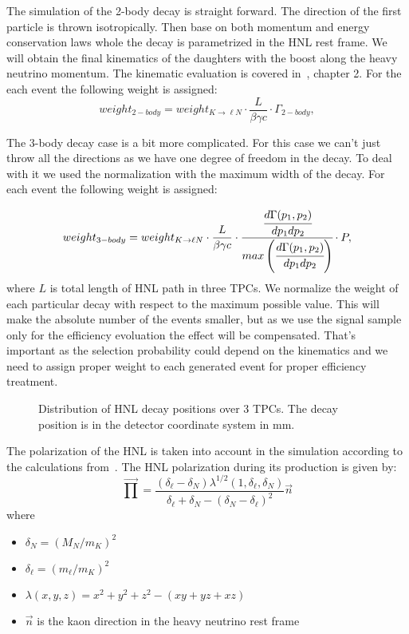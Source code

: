 \documentclass[../main.tex]{subfiles}
\begin{document}
The simulation of the 2-body decay is straight forward. The direction of the first particle is thrown isotropically. Then base on both momentum and energy conservation laws whole the decay is parametrized in the HNL rest frame. We will obtain the final kinematics of the daughters with the boost along the heavy neutrino momentum. The kinematic evaluation is covered in~\cite{landau2013}, chapter 2. For the each event the following weight is assigned:
\begin{equation}
    weight_{2-body}=weight_{K\rightarrow \ell N}\cdot\frac{L}{\beta\gamma c}\cdot\Gamma_{2-body},
\end{equation}

The 3-body decay case is a bit more complicated. For this case we can't just throw all the directions as we have one degree of freedom in the decay. To deal with it we used the normalization with the maximum width of the decay. For each event the following weight is assigned:

\begin{equation}
    weight_{3-body}=weight_{K\rightarrow \ell N}\cdot\frac{L}{\beta\gamma c}\cdot\cfrac{\cfrac{d\Gamma(p_1,p_2)}{dp_1dp_2}}{max\left(\cfrac{d\Gamma(p_1,p_2)}{dp_1dp_2}\right)}\cdot P,
\end{equation}
where $L$ is total length of HNL path in three TPCs. We normalize the weight of each particular decay with respect to the maximum possible value. This will make the absolute number of the events smaller, but as we use the signal sample only for the efficiency evoluation the effect will be compensated. That's important as the selection probability could depend on the kinematics and we need to assign proper weight to each generated event for proper efficiency treatment.

\begin{figure}[!ht]
    \caption{Distribution of HNL decay positions over 3 TPCs. The decay position is in the detector coordinate system in mm.}
    \label{fig:HNL:decayPos}
\end{figure}

 The polarization of the HNL is taken into account in the simulation according to the calculations from~\cite{Abgrall2014}. The HNL polarization during its production is given by:
 \begin{equation}
    \overrightarrow\prod=\frac{\left(\delta_\ell-\delta_{N}\right)\lambda^{1/2}\left(1,\delta_\ell, \delta_{N}\right)}{\delta_\ell+\delta_{N}-\left(\delta_{N}-\delta_\ell\right)^2}\overrightarrow{n}
 \end{equation}
where
\begin{itemize}
    \item $\delta_{N}=\left(M_{N}/m_K\right)^2$
    \item $\delta_\ell=\left(m_\ell/m_K\right)^2$
    \item $\lambda\left(x, y, z\right)=x^2+y^2+z^2-\left(xy+yz+xz\right)$
    \item $\overrightarrow{n}$ is the kaon direction in the heavy neutrino rest frame
\end{itemize}
\end{document}

